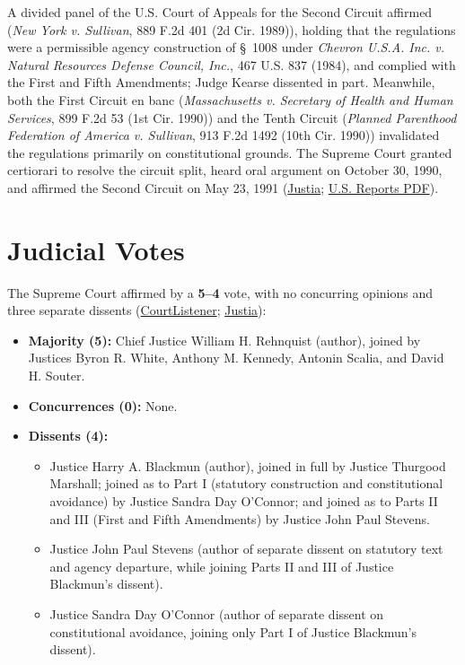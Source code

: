 \documentclass[12pt]{article}
\begin{document}
A divided panel of the U.S. Court of Appeals for the Second Circuit affirmed (\textit{New York v. Sullivan}, 889 F.2d 401 (2d Cir. 1989)), holding that the regulations were a permissible agency construction of \S~1008 under \textit{Chevron U.S.A. Inc. v. Natural Resources Defense Council, Inc.}, 467 U.S. 837 (1984), and complied with the First and Fifth Amendments; Judge Kearse dissented in part. Meanwhile, both the First Circuit en banc (\textit{Massachusetts v. Secretary of Health and Human Services}, 899 F.2d 53 (1st Cir. 1990)) and the Tenth Circuit (\textit{Planned Parenthood Federation of America v. Sullivan}, 913 F.2d 1492 (10th Cir. 1990)) invalidated the regulations primarily on constitutional grounds. The Supreme Court granted certiorari to resolve the circuit split, heard oral argument on October 30, 1990, and affirmed the Second Circuit on May 23, 1991 (\href{https://supreme.justia.com/cases/federal/us/500/173/}{Justia}; \href{https://tile.loc.gov/storage-services/service/ll/usrep/usrep500/usrep500173/usrep500173.pdf}{U.S. Reports PDF}).

\section{Judicial Votes}

The Supreme Court affirmed by a \textbf{5--4} vote, with no concurring opinions and three separate dissents (\href{https://www.courtlistener.com/opinion/112593/rust-v-sullivan/}{CourtListener}; \href{https://supreme.justia.com/cases/federal/us/500/173/}{Justia}):

\begin{itemize}
\item \textbf{Majority (5):} Chief Justice William H. Rehnquist (author), joined by Justices Byron R. White, Anthony M. Kennedy, Antonin Scalia, and David H. Souter.
\item \textbf{Concurrences (0):} None.
\item \textbf{Dissents (4):}
  \begin{itemize}
  \item Justice Harry A. Blackmun (author), joined in full by Justice Thurgood Marshall; joined as to Part I (statutory construction and constitutional avoidance) by Justice Sandra Day O'Connor; and joined as to Parts II and III (First and Fifth Amendments) by Justice John Paul Stevens.
  \item Justice John Paul Stevens (author of separate dissent on statutory text and agency departure, while joining Parts II and III of Justice Blackmun's dissent).
  \item Justice Sandra Day O'Connor (author of separate dissent on constitutional avoidance, joining only Part I of Justice Blackmun's dissent).
  \end{itemize}
\end{itemize}
\end{document}
